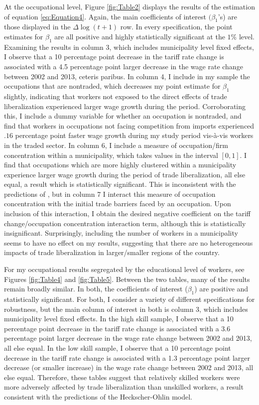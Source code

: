 \documentclass[12pt]{article}
\begin{document}
At the occupational level, Figure \ref{fig:Table2} displays the results of the estimation of equation 
\ref{eq:Equation4}. Again, the main coefficients of interest $(\beta_1$'s) are those displayed in the 
$\Delta\log(t+1)$ row. In every specification, the point estimates for $\beta_1$ are all positive
and highly statistically significant at the $1\%$ level. Examining the results in column 3, which
includes municipality level fixed effects, I observe that a 10 percentage point decrease in the tariff 
rate change is associated with a 4.5 percentage point larger decrease in the wage rate change between 
2002 and 2013, ceteris paribus. In column 4, I include in my sample the occupations that are nontraded,
which decreases my point estimate for $\beta_1$ slightly, indicating that workers not exposed to 
the direct effects of trade liberalization experienced larger wage growth during the period. 
Corroborating
this, I include a dummy variable for whether an occupation is nontraded, and find that workers in
occupations not facing competition from imports experienced $.16$ percentage point faster wage growth
during my study period vis-\`{a}-vis workers in the traded sector. In column 6, I include a measure of occupation/firm concentration within a
municipality, which takes values in the interval $[0,1]$. I find that occupations which are more highly 
clustered within a municipality experience larger wage growth during the period of trade liberalization, 
all else equal, a result which is statistically significant. This is inconsistent with the 
predictions of \citet{holmes1}, but in column 7 I interact this measure
of occupation concentration with the initial trade barriers faced by an occupation.
Upon inclusion of this interaction, I obtain the desired negative coefficient on the tariff
change/occupation concentration interaction term, although this is statistically insignificant.
Surprisingly, including the number of workers in a municipality seems to have no effect on my
results, suggesting that there are no heterogeneous impacts of trade liberalization in larger/smaller
regions of the country.

For my occupational results segregated by the educational level of workers, see Figures \ref{fig:Table4}
and \ref{fig:Table5}. Between the two tables, many of the results remain broadly similar. In both,
the coefficients of interest ($\beta_1$) are positive and statistically significant. For both,
I consider a variety of different specifications for robustness, but the main column of interest
in both is column 3, which includes municipality level fixed effects. In the high skill sample,
I observe that a 10 percentage point decrease in the tariff 
rate change is associated with a 3.6 percentage point larger decrease in the wage rate change between 
2002 and 2013, all else equal. In the low skill sample,
I observe that a 10 percentage point decrease in the tariff 
rate change is associated with a 1.3 percentage point larger decrease (or smaller increase) 
in the wage rate change between 2002 and 2013, all else equal. Therefore, these tables suggest
that relatively skilled workers were more adversely affected by trade liberalization than unskilled
workers, a result consistent with the predictions of the Heckscher-Ohlin model.
\end{document}
